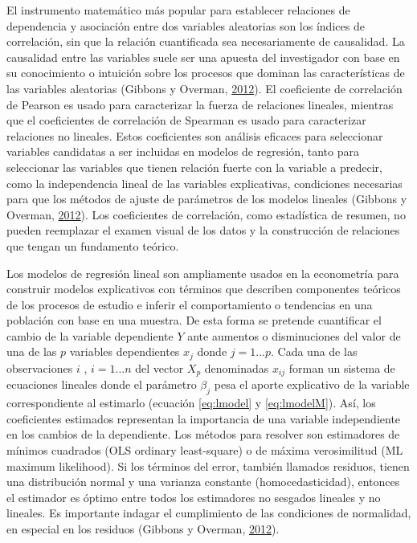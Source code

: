 \documentclass[12pt,a4paper,openany]{book}
\theoremstyle{definition}
\theoremstyle{definition}
\theoremstyle{definition}
\theoremstyle{remark}
\begin{document}
El instrumento matemático más popular para establecer relaciones de
dependencia y asociación entre dos variables aleatorias son los índices
de correlación, sin que la relación cuantificada sea necesariamente de
causalidad. La causalidad entre las variables suele ser una apuesta del
investigador con base en su conocimiento o intuición sobre los procesos
que dominan las características de las variables aleatorias (Gibbons y
Overman, \protect\hyperlink{ref-gibbons_mostly_2012}{2012}). El
coeficiente de correlación de Pearson es usado para caracterizar la
fuerza de relaciones lineales, mientras que el coeficientes de
correlación de Spearman es usado para caracterizar relaciones no
lineales. Estos coeficientes son análisis eficaces para seleccionar
variables candidatas a ser incluidas en modelos de regresión, tanto para
seleccionar las variables que tienen relación fuerte con la variable a
predecir, como la independencia lineal de las variables explicativas,
condiciones necesarias para que los métodos de ajuste de parámetros de
los modelos lineales (Gibbons y Overman,
\protect\hyperlink{ref-gibbons_mostly_2012}{2012}). Los coeficientes de
correlación, como estadística de resumen, no pueden reemplazar el examen
visual de los datos y la construcción de relaciones que tengan un
fundamento teórico.

Los modelos de regresión lineal son ampliamente usados en la econometría
para construir modelos explicativos con términos que describen
componentes teóricos de los procesos de estudio e inferir el
comportamiento o tendencias en una población con base en una muestra. De
esta forma se pretende cuantificar el cambio de la variable dependiente
\(Y\) ante aumentos o disminuciones del valor de una de las \(p\)
variables dependientes \(x_j\) donde \(j =1...p\). Cada una de las
observaciones \(i\) , \(i=1...n\) del vector \(X_p\) denominadas
\(x_{ij}\) forman un sistema de ecuaciones lineales donde el parámetro
\(\beta_j\) pesa el aporte explicativo de la variable correspondiente al
estimarlo (ecuación \eqref{eq:lmodel} y \eqref{eq:lmodelM}). Así, los
coeficientes estimados representan la importancia de una variable
independiente en los cambios de la dependiente. Los métodos para
resolver son estimadores de mínimos cuadrados (OLS ordinary
least-square) o de máxima verosimilitud (ML maximum likelihood). Si los
términos del error, también llamados residuos, tienen una distribución
normal y una varianza constante (homocedasticidad), entonces el
estimador es óptimo entre todos los estimadores no sesgados lineales y
no lineales. Es importante indagar el cumplimiento de las condiciones de
normalidad, en especial en los residuos (Gibbons y Overman,
\protect\hyperlink{ref-gibbons_mostly_2012}{2012}).
\end{document}
